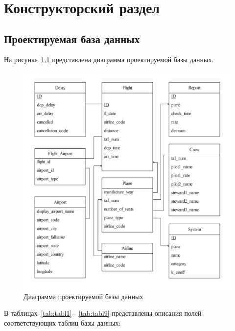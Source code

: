 \chapter{Конструкторский раздел}

\section{Проектируемая база данных}

На рисунке~\ref{fig:uml} представлена диаграмма проектируемой базы данных.
\begin{figure}[h]
    \centering
    \includegraphics[scale=0.9]{inc/Drawing3}
    \caption{Диаграмма проектируемой базы данных}
    \label{fig:uml}
\end{figure}

\newpage
В таблицах~\ref{tab:tabl1}--~\ref{tab:tabl9} представлены описания полей соответствующих таблиц базы данных:

